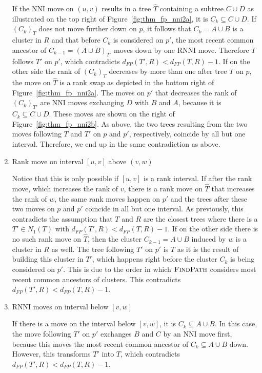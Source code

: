 \documentclass{amsart}
\newcommand{\rnni}{\mathrm{RNNI}}
\newcommand{\findpath}{\textsc{FindPath}}
\newcommand{\nni}{\mathrm{NNI}}
\begin{document}
\begin{enumerate}
    If the $\nni$ move on $(u,v)$ results in a tree $\hat T$ containing a subtree $C \cup D$ as illustrated on the top right of Figure~\ref{fig:thm_fp_nni2a}, it is $C_k \subseteq C \cup D$.
    If $(C_k)_T$ does not move further down on $p$, it follows that $C_k = A \cup B$ is a cluster in $R$ and that before $C_k$ is considered on $p'$, the most recent common ancestor of $C_{k-1} = (A \cup B)_{T'}$ moves down by one $\rnni$ move.
    Therefore $T$ follows $T'$ on $p'$, which contradicts $d_{FP}(T',R) < d_{FP}(T,R) - 1$.
    If on the other side the rank of $(C_k)_T$ decreases by more than one after tree $T$ on $p$, the move on $\hat T$ is a rank swap as depicted in the bottom right of Figure~\ref{fig:thm_fp_nni2a}.
    The moves on $p'$ that decreases the rank of $(C_k)_{T'}$ are $\nni$ moves exchanging $D$ with $B$ and $A$, because it is $C_k \subseteq C \cup D$.
    These moves are shown on the right of Figure~\ref{fig:thm_fp_nni2b}.
    As above, the two trees resulting from the two moves following $T$ and $T'$ on $p$ and $p'$, respectively, coincide by all but one interval.
    Therefore, we end up in the same contradiction as above.

    \item Rank move on interval $[u,v]$ above $(v,w)$

    Notice that this is only possible if $[u,v]$ is a rank interval.
    If after the rank move, which increases the rank of $v$, there is a rank move on $\hat T$ that increases the rank of $w$, the same rank moves happen on $p'$ and the trees after these two moves on $p$ and $p'$ coincide in all but one interval.
    As previously, this contradicts the assumption that $T$ and $R$ are the closest trees where there is a $T' \in N_1(T)$ with $d_{FP}(T',R) < d_{FP}(T,R) - 1$.
    If on the other side there is no such rank move on $\hat T$, then the cluster $C_{k-1} = A \cup B$ induced by $w$ is a cluster in $R$ as well.
    The tree following $T'$ on $p'$ is $T$ as it is the result of building this cluster in $T'$, which happens right before the cluster $C_k$ is being considered on $p'$.
    This is due to the order in which $\findpath$ considers most recent common ancestors of clusters.
    This contradicts $d_{FP}(T',R) < d_{FP}(T,R) - 1$.

    \item $\rnni$ moves on interval below $[v,w]$

    If there is a move on the interval below $[v,w]$, it is $C_k \subseteq A \cup B$.
    In this case, the move following $T'$ on $p'$ exchanges $B$ and $C$ by an $\nni$ move first, because this moves the most recent common ancestor of $C_k \subseteq A \cup B$ down.
    However, this transforms $T'$ into $T$, which contradicts $d_{FP}(T',R) < d_{FP}(T,R) - 1$.
\end{enumerate}
\end{document}
